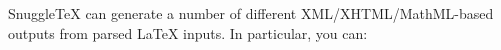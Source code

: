 
SnuggleTeX can generate a number of different XML/XHTML/MathML-based outputs
from parsed LaTeX inputs. In particular, you can:

